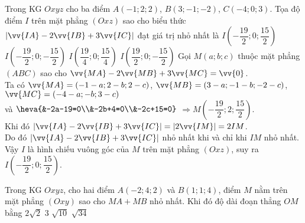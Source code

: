 \begin{ex}%
	Trong KG $Oxyz$ cho ba điểm $A(-1;2;2)$, $B(3;-1;-2)$, $C(-4;0;3)$. Tọa độ điểm $I$ trên mặt phẳng $(Oxz)$ sao cho biểu thức $\left|\vv{IA}-2\vv{IB}+3\vv{IC}\right|$ đạt giá trị nhỏ nhất là
	\choice
	{\True $I\left(-\dfrac{19}{2};0;\dfrac{15}{2}\right)$}
	{$I\left(-\dfrac{19}{2};0;-\dfrac{15}{2}\right)$}
	{$I\left(\dfrac{19}{4};0;\dfrac{15}{4}\right)$}
	{$I\left(\dfrac{19}{2};0;-\dfrac{15}{2}\right)$}
	\loigiai
	{Gọi $M(a;b;c)$ thuộc mặt phẳng $(ABC)$ sao cho $\vv{MA}-2\vv{MB}+3\vv{MC}=\vv{0}$.\\
		Ta có $\vv{MA}=(-1-a;2-b;2-c)$, $\vv{MB}=(3-a;-1-b;-2-c)$, $\vv{MC}=(-4-a;-b;3-c)$\\
		và $\heva{&-2a-19=0\\&-2b+4=0\\&-2c+15=0}$ $\Rightarrow M\left(-\dfrac{19}{2};2;\dfrac{15}{2}\right)$.\\
		Khi đó $\left|\vv{IA}-2\vv{IB}+3\vv{IC}\right|=\left|2\vv{IM}\right|=2IM$.\\
		Do đó $\left|\vv{IA}-2\vv{IB}+3\vv{IC}\right|$ nhỏ nhất khi và chỉ khi $IM$ nhỏ nhất. Vậy $I$ là hình chiếu vuông góc của $M$ trên mặt phẳng $(Oxz)$, suy ra $I\left(-\dfrac{19}{2};0;\dfrac{15}{2}\right)$.
	}
\end{ex}
\begin{ex}%
	Trong KG $Oxyz$, cho hai điểm $A(-2;4;2)$ và $B(1;1;4)$, điểm $M$ nằm trên mặt phẳng $(Oxy)$ sao cho $MA+MB$ nhỏ nhất. Khi đó độ dài đoạn thẳng $OM$ bằng
	\choice
	{$2\sqrt{2}$}
	{$3$}
	{\True $\sqrt{10}$}
	{$\sqrt{34}$}
\end{ex}
